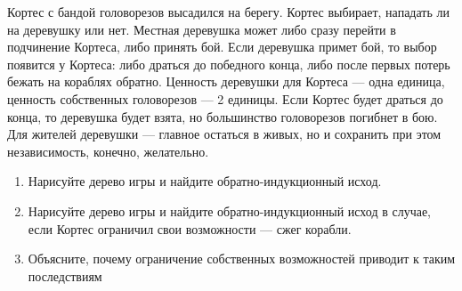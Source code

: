 \begin{problem}[Кортес {[О]}]\par
Кортес с бандой головорезов высадился на берегу. Кортес выбирает, нападать ли на деревушку или нет. Местная деревушка может либо сразу перейти в подчинение Кортеса, либо принять бой. Если деревушка примет бой, то выбор появится у Кортеса: либо драться до победного конца, либо после первых потерь бежать на кораблях обратно. Ценность деревушки для Кортеса --- одна единица, ценность собственных головорезов --- 2 единицы. Если Кортес будет драться до конца, то деревушка будет взята, но большинство головорезов погибнет в бою. Для жителей деревушки --- главное остаться в живых, но и сохранить при этом независимость, конечно, желательно.\par
\begin{enumerate}
\item  Нарисуйте дерево игры и найдите обратно-индукционный исход.\par
\item Нарисуйте дерево игры и найдите обратно-индукционный исход в случае, если Кортес ограничил свои возможности --- сжег корабли.\par
\item  Объясните, почему ограничение собственных возможностей приводит к таким последствиям \par
\end{enumerate}


\begin{sol}

\end{sol}
\end{problem}




